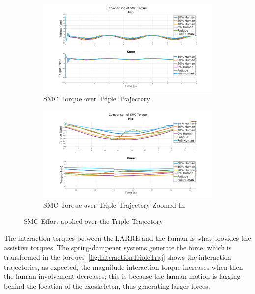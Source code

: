 \begin{figure}
    \begin{subfigure}{\linewidth}
        \centering
        \includegraphics[width=\columnwidth]{images/controllers/trajs/SMC_full.png}
        \caption[SMC Torque over Triple Trajectory]{SMC Torque over Triple Trajectory}
        \label{fig:SMCTripleFull}
    \end{subfigure}
    \begin{subfigure}{\linewidth}
        \centering
        \includegraphics[width=\columnwidth]{images/controllers/trajs/SMC_zoom.png}
        \caption[SMC Torque over Triple Trajectory Zoomed]{SMC Torque over Triple Trajectory Zoomed In}
        \label{fig:SMCTripleZoom}
    \end{subfigure}
    \caption{SMC Effort applied over the Triple Trajectory}
    \label{fig:SMCEffortTriple}
\end{figure}

The interaction torques between the LARRE and the human is what provides the assistive torques. The spring-dampener systems generate the force, which is transformed in the torques. \autoref{fig:InteractionTripleTraj} shows the interaction trajectories, as expected, the magnitude interaction torque increases when then the human involvement decreases; this is because the human motion is lagging behind the location of the exoskeleton, thus generating larger forces. 

